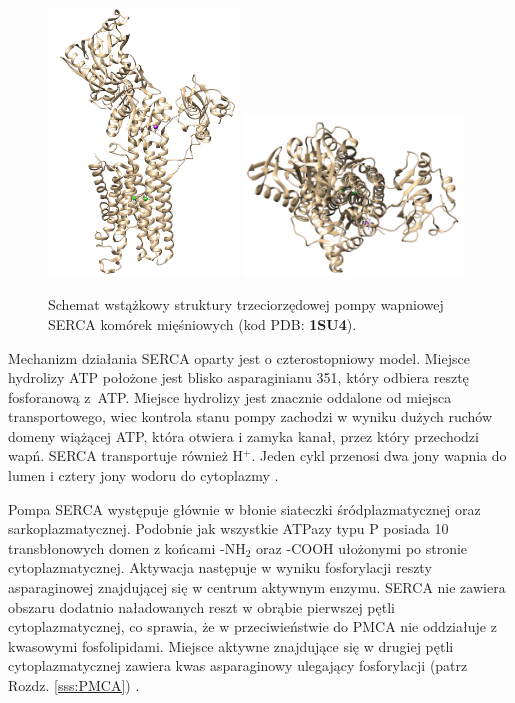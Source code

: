 \begin{figure}[h]
 \begin{center}
  \includegraphics[width=0.45\textwidth]{rysunki/rozdzial_1/serca.png}
  \includegraphics[width=0.52\textwidth]{rysunki/rozdzial_1/serca2.png}
 \end{center}
 \caption[Pompa wapniowa SERCA]{Schemat wstążkowy struktury trzeciorzędowej pompy wapniowej SERCA komórek mięśniowych (kod PDB: \textbf{1SU4})\cite{Toyoshima2000}.}
 \label{fig:SERCA}
\end{figure}


Mechanizm działania SERCA oparty jest o czterostopniowy model. Miejsce hydrolizy ATP położone jest blisko asparaginianu 351, który odbiera resztę fosforanową z~ATP. Miejsce hydrolizy jest znacznie oddalone od miejsca transportowego, wiec kontrola stanu pompy zachodzi w wyniku dużych ruchów domeny wiążącej ATP, która otwiera i zamyka kanał, przez który przechodzi wapń. SERCA transportuje również H$^+$. Jeden cykl przenosi dwa jony wapnia do lumen i cztery jony wodoru do cytoplazmy \cite{Laude2009}.

Pompa SERCA występuje głównie w błonie siateczki śródplazmatycznej oraz sarkoplazmatycznej. Podobnie jak wszystkie ATPazy typu P posiada 10 transbłonowych domen z końcami -NH$_2$ oraz -COOH ułożonymi po stronie cytoplazmatycznej. Aktywacja następuje w wyniku fosforylacji reszty asparaginowej znajdującej się w centrum aktywnym enzymu. SERCA nie zawiera obszaru dodatnio naładowanych reszt w obrąbie pierwszej pętli cytoplazmatycznej, co sprawia, że w przeciwieństwie do PMCA nie oddziałuje z kwasowymi fosfolipidami. Miejsce aktywne znajdujące się w drugiej pętli cytoplazmatycznej zawiera kwas asparaginowy ulegający fosforylacji (patrz Rozdz. \ref{sss:PMCA}) \cite{Brini2000,Lopreiato2014}.


